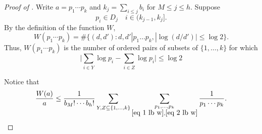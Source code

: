 \documentclass{amsart}
\theoremstyle{definition}
\numberwithin{equation}{section}
\begin{document}
	\begin{proof}[Proof of ]
		Write $a = p_1 \cdots p_k$ and $k_j = \sum_{i \leq j} b_i$ for $M \leq j \leq h$. Suppose 
		\begin{equation}\label{eq 1 lb w}
			p_i \in D_j \quad i \in (k_{j-1},k_j].
		\end{equation}
		By the definition of the function $W$,  
		$$W(p_1 \cdots p_k) = \#\big\{(d,d') : d,d'|p_1\dots p_k, |\log (d/d')| \leq \log 2\big\}.$$
		Thus, $W(p_1 \cdots p_k)$ is the number of ordered pairs of subsets of $\{1,\dots,k\}$ for which
		\begin{equation}\label{eq 2 lb w}
			\Big|\sum_{i \in Y}\log p_i - \sum_{i \in Z} \log p_i\Big| \leq \log 2
		\end{equation}
		
		Notice that 
		\begin{equation} \label{eq 3 lb w}
			\frac{W(a)}{a} \leq \frac{1}{b_M! \cdots b_h!} \sum_{Y,Z \subseteq \{1,\dots,k\}}  \sum_{\substack{p_1,\dots,p_k\\ \eqref{eq 1 lb w}, \eqref{eq 2 lb w}}} \frac{1}{p_1\cdots p_k}.
		\end{equation}
	

\end{proof}
\end{document}
